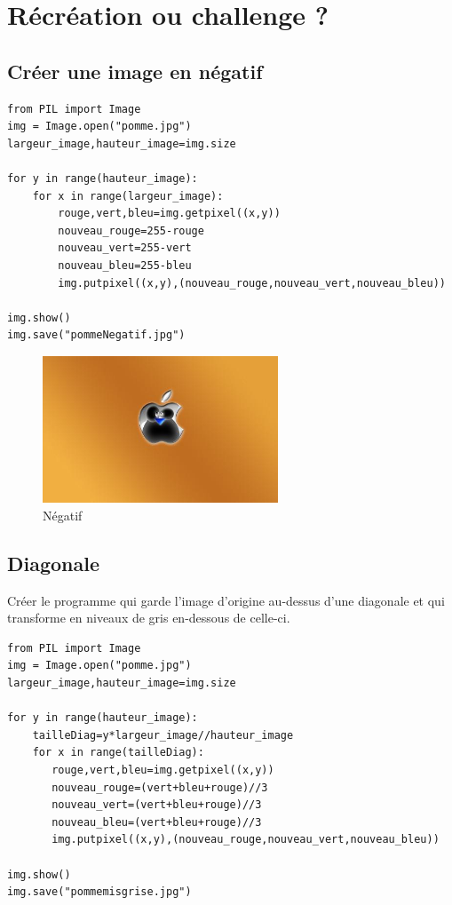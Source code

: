 \documentclass[11pt]{article}
\begin{document}
\section{Récréation ou challenge ?}
\label{sec:orgc374b73}

\subsection{Créer une image en négatif}
\label{sec:orge6a005a}

\begin{verbatim}
from PIL import Image
img = Image.open("pomme.jpg")
largeur_image,hauteur_image=img.size

for y in range(hauteur_image):
    for x in range(largeur_image):
        rouge,vert,bleu=img.getpixel((x,y))
        nouveau_rouge=255-rouge
        nouveau_vert=255-vert
        nouveau_bleu=255-bleu
        img.putpixel((x,y),(nouveau_rouge,nouveau_vert,nouveau_bleu))

img.show()
img.save("pommeNegatif.jpg")
\end{verbatim}

\begin{figure}[htbp]
\centering
\includegraphics[width=7cm]{pommeNegatif.jpg}
\caption{Négatif}
\end{figure}

\subsection{Diagonale}
\label{sec:org3665238}

Créer le programme qui garde l'image d'origine au-dessus d'une diagonale et qui transforme en niveaux de gris en-dessous de celle-ci.

\begin{verbatim}
from PIL import Image
img = Image.open("pomme.jpg")
largeur_image,hauteur_image=img.size

for y in range(hauteur_image):
    tailleDiag=y*largeur_image//hauteur_image
    for x in range(tailleDiag):
       rouge,vert,bleu=img.getpixel((x,y))
       nouveau_rouge=(vert+bleu+rouge)//3
       nouveau_vert=(vert+bleu+rouge)//3
       nouveau_bleu=(vert+bleu+rouge)//3
       img.putpixel((x,y),(nouveau_rouge,nouveau_vert,nouveau_bleu))

img.show()
img.save("pommemisgrise.jpg")
\end{verbatim}
\end{document}
